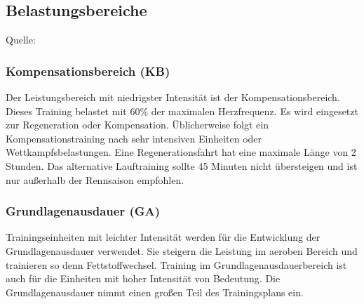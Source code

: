 \subsection{Belastungsbereiche}
    Quelle: \cite[31-39]{Radsporttraining}
\subsubsection{Kompensationsbereich (KB)}
Der Leistungsbereich mit niedrigster Intensität ist der Kompensationsbereich. Dieses Training belastet mit 60\% der maximalen Herzfrequenz. Es wird eingesetzt zur Regeneration oder Kompensation. Üblicherweise folgt ein Kompensationstraining nach sehr intensiven Einheiten oder Wettkampfsbelastungen. \cite[31-32]{Radsporttraining}
Eine Regenerationsfahrt hat eine maximale Länge von 2 Stunden. Das alternative Lauftraining sollte 45 Minuten nicht übersteigen und ist nur außerhalb der Rennsaison empfohlen.
\subsubsection{Grundlagenausdauer (GA)}
Trainingseinheiten mit leichter Intensität werden für die Entwicklung der Grundlagenausdauer verwendet. Sie steigern die Leistung im aeroben Bereich und trainieren so denn Fettstoffwechsel. 
Training im Grundlagenausdauerbereich ist auch für die Einheiten mit hoher Intensität von Bedeutung. Die Grundlagenausdauer nimmt einen großen Teil des Trainingsplans ein.
